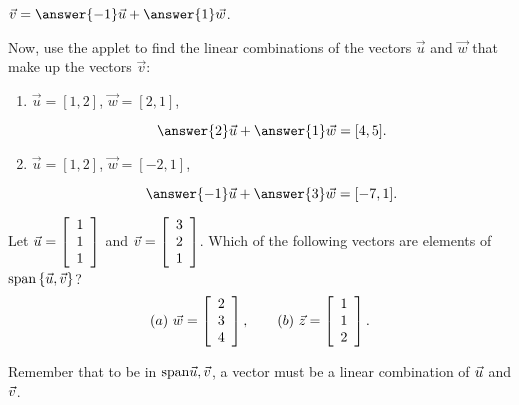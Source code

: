 \documentclass{ximera}
\begin{document}
\begin{exploration}
\begin{example}
\begin{solution}
    $\vec{v}=\answer{-1}\vec{u}+\answer{1}\vec{w}$.

  \end{solution}

\end{example}

\begin{example}

  Now, use the applet to find the linear combinations of the vectors $\vec{u}$ and $\vec{w}$ that make up the vectors $\vec{v}$:

  \begin{enumerate}
  
    \item $\vec{u}=[1,2]$, $\vec{w}=[2,1]$, 
    
    $$\answer{2}\vec{u}+\answer{1}\vec{w}=[4,5].$$

    \item $\vec{u}=[1,2]$, $\vec{w}=[-2,1]$,
    
    $$\answer{-1}\vec{u}+\answer{3}\vec{w}=[-7,1].$$

  \end{enumerate}

\end{example}

\begin{example}

  Let $\vect{u}=\startmat{r} 1 \\ 1 \\ 1 \stopmat$ and
  $\vect{v}=\startmat{r} 3 \\ 2 \\ 1 \stopmat$. Which
  of the following vectors are elements of
  $\sspan\set{\vect{u},\vect{v}}$?
  \begin{equation*}
    (a)\quad\vect{w} = \startmat{r} 2 \\ 3 \\ 4 \stopmat,
    \qquad
    (b)\quad\vect{z} = \startmat{r} 1 \\ 1 \\ 2 \stopmat.
  \end{equation*}

  \begin{hint}
  
    Remember that to be in $\sspan{\vect{u},\vect{v}}$, a vector must be a linear combination of $\vect{u}$ and $\vect{v}$.

  \end{hint}

  \begin{solution}


\end{solution}
\end{example}
\end{exploration}
\end{document}
